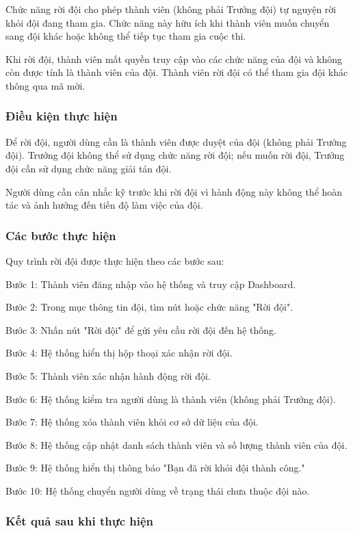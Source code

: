 Chức năng rời đội cho phép thành viên (không phải Trưởng đội) tự nguyện rời khỏi đội đang tham gia. Chức năng này hữu ích khi thành viên muốn chuyển sang đội khác hoặc không thể tiếp tục tham gia cuộc thi.

Khi rời đội, thành viên mất quyền truy cập vào các chức năng của đội và không còn được tính là thành viên của đội. Thành viên rời đội có thể tham gia đội khác thông qua mã mời.

\subsubsection{Điều kiện thực hiện}

Để rời đội, người dùng cần là thành viên được duyệt của đội (không phải Trưởng đội). Trưởng đội không thể sử dụng chức năng rời đội; nếu muốn rời đội, Trưởng đội cần sử dụng chức năng giải tán đội.

Người dùng cần cân nhắc kỹ trước khi rời đội vì hành động này không thể hoàn tác và ảnh hưởng đến tiến độ làm việc của đội.

\subsubsection{Các bước thực hiện}

Quy trình rời đội được thực hiện theo các bước sau:

Bước 1: Thành viên đăng nhập vào hệ thống và truy cập Dashboard.

Bước 2: Trong mục thông tin đội, tìm nút hoặc chức năng "Rời đội".

Bước 3: Nhấn nút "Rời đội" để gửi yêu cầu rời đội đến hệ thống.

Bước 4: Hệ thống hiển thị hộp thoại xác nhận rời đội.

Bước 5: Thành viên xác nhận hành động rời đội.

Bước 6: Hệ thống kiểm tra người dùng là thành viên (không phải Trưởng đội).

Bước 7: Hệ thống xóa thành viên khỏi cơ sở dữ liệu của đội.

Bước 8: Hệ thống cập nhật danh sách thành viên và số lượng thành viên của đội.

Bước 9: Hệ thống hiển thị thông báo "Bạn đã rời khỏi đội thành công."

Bước 10: Hệ thống chuyển người dùng về trạng thái chưa thuộc đội nào.

\subsubsection{Kết quả sau khi thực hiện}

